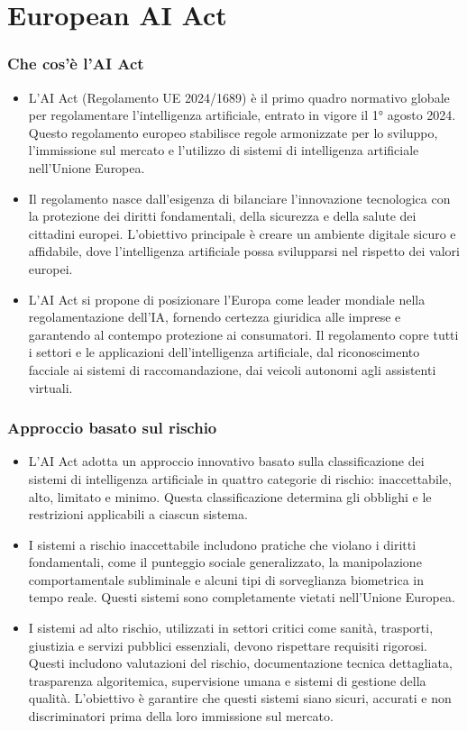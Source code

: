 \documentclass{beamer}
\begin{document}
\section{European AI Act}
%
%
\begin{frame}
\frametitle{Che cos'è l'AI Act}
\begin{itemize}
\small
\item L'AI Act (Regolamento UE 2024/1689) è il primo quadro normativo globale per regolamentare l'intelligenza artificiale, entrato in vigore il 1° agosto 2024. Questo regolamento europeo stabilisce regole armonizzate per lo sviluppo, l'immissione sul mercato e l'utilizzo di sistemi di intelligenza artificiale nell'Unione Europea.

\item Il regolamento nasce dall'esigenza di bilanciare l'innovazione tecnologica con la protezione dei diritti fondamentali, della sicurezza e della salute dei cittadini europei. L'obiettivo principale è creare un ambiente digitale sicuro e affidabile, dove l'intelligenza artificiale possa svilupparsi nel rispetto dei valori europei.

\item L'AI Act si propone di posizionare l'Europa come leader mondiale nella regolamentazione dell'IA, fornendo certezza giuridica alle imprese e garantendo al contempo protezione ai consumatori. Il regolamento copre tutti i settori e le applicazioni dell'intelligenza artificiale, dal riconoscimento facciale ai sistemi di raccomandazione, dai veicoli autonomi agli assistenti virtuali.
\end{itemize}
\end{frame}
%
%
\begin{frame}
\frametitle{Approccio basato sul rischio}
\begin{itemize}
\small
\item L'AI Act adotta un approccio innovativo basato sulla classificazione dei sistemi di intelligenza artificiale in quattro categorie di rischio: inaccettabile, alto, limitato e minimo. Questa classificazione determina gli obblighi e le restrizioni applicabili a ciascun sistema.

\item I sistemi a rischio inaccettabile includono pratiche che violano i diritti fondamentali, come il punteggio sociale generalizzato, la manipolazione comportamentale subliminale e alcuni tipi di sorveglianza biometrica in tempo reale. Questi sistemi sono completamente vietati nell'Unione Europea.

\item I sistemi ad alto rischio, utilizzati in settori critici come sanità, trasporti, giustizia e servizi pubblici essenziali, devono rispettare requisiti rigorosi. Questi includono valutazioni del rischio, documentazione tecnica dettagliata, trasparenza algoritemica, supervisione umana e sistemi di gestione della qualità. L'obiettivo è garantire che questi sistemi siano sicuri, accurati e non discriminatori prima della loro immissione sul mercato.
\end{itemize}
\end{frame}
\end{document}
